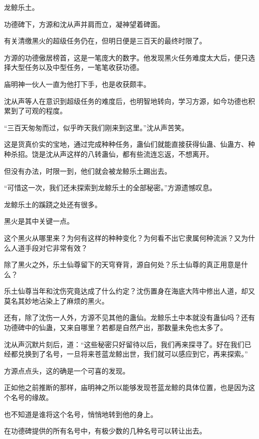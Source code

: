 
\begin{this_body}



龙鲸乐土。

功德碑下，方源和沈从声并肩而立，凝神望着碑面。

有关清缴黑火的超级任务仍在，但明日便是三百天的最终时限了。

方源的功德傲居榜首，这是一笔庞大的数字。他发现黑火任务难度太大后，便只选择大型任务以及中型任务，一笔笔收获功德。

庙明神一伙人一直为他打下手，也是收获颇丰。

沈从声等人在意识到超级任务的难度后，也明智地转向，学习方源，如今功德也积累到了可观的程度。

“三百天匆匆而过，似乎昨天我们刚来到这里。”沈从声苦笑。

这是货真价实的宝地，通过完成种种任务，蛊仙们就能直接获得仙蛊、仙蛊方、种种杀招。饶是沈从声这样的八转蛊仙，都有些流连忘返，不想离开。

但没有办法，时限一到，他们就会被龙鲸乐土踢出去。

“可惜这一次，我们还未探索到龙鲸乐土的全部秘密。”方源遗憾叹息。

龙鲸乐土的蹊跷之处还有很多。

黑火是其中关键一点。

这个黑火从哪里来？为何有这样的种种变化？为何看不出它隶属何种流派？又为什么人道手段对它非常有效？

除了黑火之外，乐土仙尊留下的天穹脊背，源自何处？乐土仙尊的真正用意是什么？

乐土仙尊当年和沈伤究竟达成了什么约定？沈伤置身在海底大阵中修出人道，却又莫名其妙地沾染上了麻烦的黑火。

还有，除了沈伤一人外，方源不见其他的蛊仙。龙鲸乐土中本就没有蛊仙吗？还有功德碑中的仙蛊，又来自哪里？若都是自然产出，那数量未免也太多了。

沈从声沉默片刻后，道：“这些秘密只好留待以后，我们再来探寻了。好在我们已经都兑换到了名号，一旦将来苍蓝龙鲸出世，我们就可以感应到它，再来探索。”

方源点点头，这的确是一个可喜的发现。

正如他之前推断的那样，庙明神之所以能够发现苍蓝龙鲸的具体位置，也是因为这个名号的缘故。

也不知道是谁将这个名号，悄悄地转到他的身上。

在功德碑提供的所有名号中，有极少数的几种名号可以转让出去。


\end{this_body}

